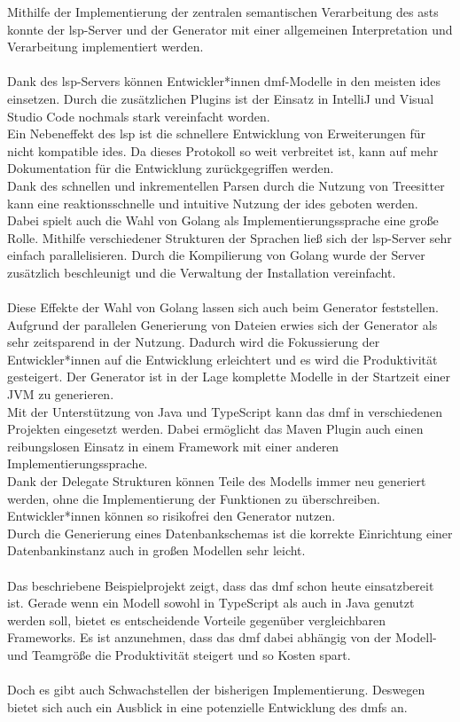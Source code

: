 \documentclass[./einleitung.tex]{subfiles}
\begin{document}
Mithilfe der Implementierung der zentralen semantischen Verarbeitung des \acrshort{ast}s konnte der \acrshort{lsp}-Server und der Generator mit einer allgemeinen Interpretation und Verarbeitung implementiert werden.
\\\\
Dank des \acrshort{lsp}-Servers können Entwickler*innen \acrshort{dmf}-Modelle in den meisten \acrshort{ide}s einsetzen.
Durch die zusätzlichen Plugins ist der Einsatz in IntelliJ und Visual Studio Code nochmals stark vereinfacht worden.\\
Ein Nebeneffekt des \acrshort{lsp} ist die schnellere Entwicklung von Erweiterungen für nicht kompatible \acrshort{ide}s.
Da dieses Protokoll so weit verbreitet ist, kann auf mehr Dokumentation für die Entwicklung zurückgegriffen werden.\\
Dank des schnellen und inkrementellen Parsen durch die Nutzung von Treesitter kann eine reaktionsschnelle und intuitive Nutzung der \acrshort{ide}s geboten werden.
Dabei spielt auch die Wahl von Golang als Implementierungssprache eine große Rolle.
Mithilfe verschiedener Strukturen der Sprachen ließ sich der \acrshort{lsp}-Server sehr einfach parallelisieren.
Durch die Kompilierung von Golang wurde der Server zusätzlich beschleunigt und die Verwaltung der Installation vereinfacht.
\\\\
Diese Effekte der Wahl von Golang lassen sich auch beim Generator feststellen.
Aufgrund der parallelen Generierung von Dateien erwies sich der Generator als sehr zeitsparend in der Nutzung.
Dadurch wird die Fokussierung der Entwickler*innen auf die Entwicklung erleichtert und es wird die Produktivität gesteigert.
Der Generator ist in der Lage komplette Modelle in der Startzeit einer JVM zu generieren.\\
Mit der Unterstützung von Java und TypeScript kann das \acrshort{dmf} in verschiedenen Projekten eingesetzt werden.
Dabei ermöglicht das Maven Plugin auch einen reibungslosen Einsatz in einem Framework mit einer anderen Implementierungssprache.\\
Dank der Delegate Strukturen können Teile des Modells immer neu generiert werden, ohne die Implementierung der Funktionen zu überschreiben.
Entwickler*innen können so risikofrei den Generator nutzen.\\
Durch die Generierung eines Datenbankschemas ist die korrekte Einrichtung einer Datenbankinstanz auch in großen Modellen sehr leicht.
\\\\
Das beschriebene Beispielprojekt zeigt, dass das \acrshort{dmf} schon heute einsatzbereit ist.
Gerade wenn ein Modell sowohl in TypeScript als auch in Java genutzt werden soll, bietet es entscheidende Vorteile gegenüber vergleichbaren Frameworks.
Es ist anzunehmen, dass das \acrshort{dmf} dabei abhängig von der Modell- und Teamgröße die Produktivität steigert und so Kosten spart.
\\\\
Doch es gibt auch Schwachstellen der bisherigen Implementierung.
Deswegen bietet sich auch ein Ausblick in eine potenzielle Entwicklung des \acrshort{dmf}s an.
\end{document}
